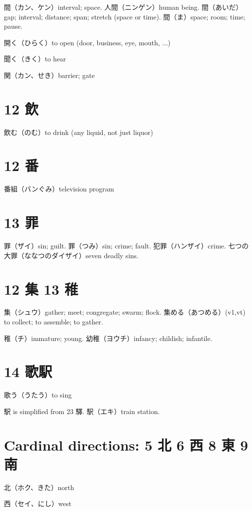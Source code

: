 間（カン、ケン）interval; space.
人間（ニンゲン）human being.
間（あいだ）gap; interval; distance; span; stretch (space or time).
間（ま）space; room; time; pause.

開く（ひらく）to open (door, business, eye, mouth, ...)

聞く（きく）to hear

関（カン、せき）barrier; gate

\section{12 飲}

飲む（のむ）to drink (any liquid, not just liquor)

\section{12 番}

番組（バンぐみ）television program

\section{13 罪}

罪（ザイ）sin; guilt.
罪（つみ）sin; crime; fault.
犯罪（ハンザイ）crime.
七つの大罪（ななつのダイザイ）seven deadly sins.

\section{12 集 13 稚}

集（シュウ）gather; meet; congregate; swarm; flock.
集める（あつめる）(v1,vt) to collect; to assemble; to gather.

稚（チ）immature; young.
幼稚（ヨウチ）infancy; childish; infantile.

\section{14 歌駅}

歌う（うたう）to sing

駅 is simplified from 23 驛.
駅（エキ）train station.

\section{Cardinal directions: 5 北 6 西 8 東 9 南}

北（ホク、きた）north

西（セイ、にし）west

